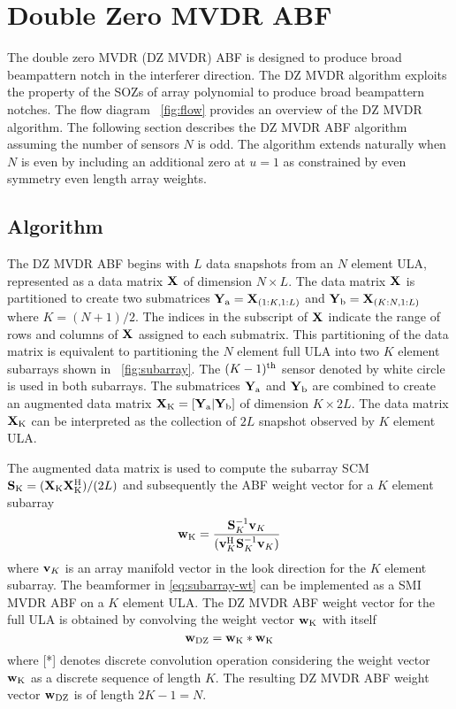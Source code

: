 \section{Double Zero MVDR ABF}
\label{sec:double-zero-mvdr}
The double zero MVDR (DZ MVDR) ABF is designed to produce broad
beampattern notch in the interferer direction. The DZ MVDR algorithm
exploits the property of the SOZs of array polynomial to produce broad beampattern notches. The flow
diagram \figurename{}~\ref{fig:flow} provides an overview of the DZ
MVDR algorithm. The following section describes the DZ MVDR ABF
algorithm assuming the number of sensors $N$ is odd. The algorithm
extends naturally when $N$ is even by including an additional zero at
$u = 1$ as constrained by even symmetry even length array weights.

\subsection{Algorithm}
\label{sec:algorithm}
The DZ MVDR ABF begins with $L$ data snapshots from an $N$ element
ULA, represented as a data matrix $\mathbf{X}_{}$ of dimension
$N \times L$.  The data matrix $\mathbf{X}_{}$ is partitioned to create
two submatrices $\mathbf{Y}_{{\rm a}} = \mathbf{X}_{(1:K, 1:L)}$ and
$\mathbf{Y}_{\rm b} = \mathbf{X}_{(K:N, 1:L)}$ where $K = (N + 1)/2$. The
indices in the subscript of $\mathbf{X}_{}$ indicate the range of rows
and columns of $\mathbf{X}_{}$ assigned to each submatrix. This
partitioning of the data matrix is equivalent to partitioning the $N$
element full ULA into two $K$ element
subarrays shown in \figurename{}~\ref{fig:subarray}. The $(K-1)^{\rm th}$ sensor denoted by white circle is used in both subarrays. The submatrices $\mathbf{Y}_{{\rm a}}$ and
$\mathbf{Y}_{{\rm b}}$ are combined to create an augmented data matrix
$\mathbf{X}_{\rm K} = [\mathbf{Y}_{{\rm a}} | \mathbf{Y}_{{\rm b}}]$ of
dimension $K \times 2L$. The data matrix $\mathbf{X}_{\rm K}$ can be
interpreted as the collection of $2L$ snapshot observed by $K$ element
ULA.

The augmented data matrix is used to compute the subarray SCM
${\bf S}_{\rm K} = (\mathbf{X}_{\rm K}\mathbf{X}_{\rm K}^{\rm H})/(2L)$ and subsequently
the ABF weight vector for a $K$ element subarray
\begin{equation}
  \label{eq:subarray-wt}
  {\bf w}_{\rm K} = \frac{{\bf S}_{K}^{-1}{\bf v}_{K}}{({\bf v}_{K}^{\rm H} {\bf S}_{K}^{-1}{\bf v}_{K})}
\end{equation}
where ${\bf v}_{K}$ is an array manifold vector in the look direction for
the $K$ element subarray. The beamformer in \eqref{eq:subarray-wt} can
be implemented as a SMI MVDR ABF on a $K$ element ULA. The DZ MVDR ABF
weight vector for the full ULA is obtained by convolving the weight vector
${\bf w}_{\rm K}$ with itself
\begin{equation}
  \label{eq:wt-convo}
  {\bf w}_{\rm DZ} = {\bf w}_{\rm K}*{\bf w}_{\rm K}
\end{equation}
where [*] denotes discrete convolution operation considering the weight vector
${\bf w}_{\rm K}$ as a discrete sequence of length $K$. The resulting DZ MVDR ABF
weight vector ${\bf w}_{\rm DZ}$ is of length $2K - 1 = N$.

